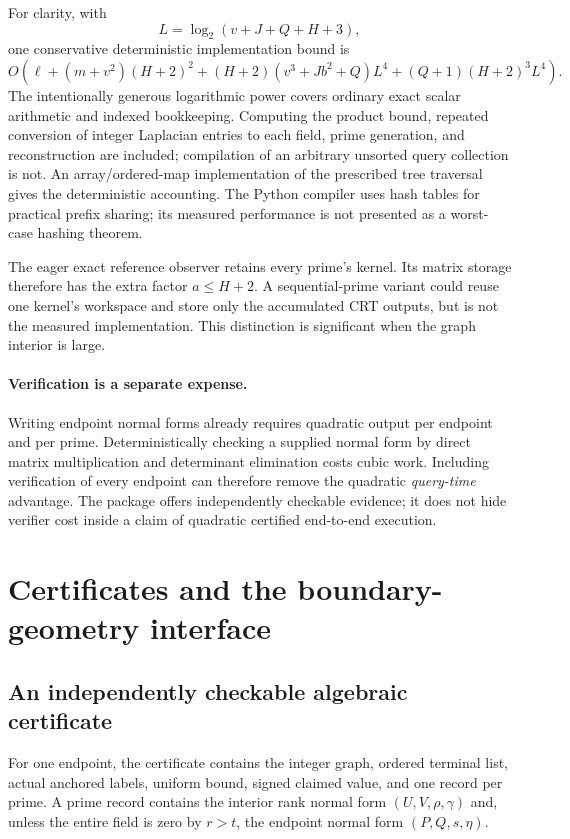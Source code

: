 \documentclass[11pt,letterpaper]{article}
\theoremstyle{definition}\newtheorem{definition}[theorem]{Definition}
\theoremstyle{remark}\newtheorem{remark}[theorem]{Remark}
\begin{document}
For clarity, with
\[
 L=\log_2(v+J+Q+H+3),
\]
one conservative deterministic implementation bound is
\begin{equation}
 O\!\left(\ell+(m+v^2)(H+2)^2
 +(H+2)(v^3+Jb^2+Q)L^4
 +(Q+1)(H+2)^3L^4\right).
 \label{eq:bitbound}
\end{equation}
The intentionally generous logarithmic power covers ordinary exact scalar arithmetic and indexed bookkeeping. Computing the product bound, repeated conversion of integer Laplacian entries to each field, prime generation, and reconstruction are included; compilation of an arbitrary unsorted query collection is not. An array/ordered-map implementation of the prescribed tree traversal gives the deterministic accounting. The Python compiler uses hash tables for practical prefix sharing; its measured performance is not presented as a worst-case hashing theorem.

The eager exact reference observer retains every prime's kernel. Its matrix storage therefore has the extra factor $a\leq H+2$. A sequential-prime variant could reuse one kernel's workspace and store only the accumulated CRT outputs, but is not the measured implementation. This distinction is significant when the graph interior is large.

\paragraph{Verification is a separate expense.}
Writing endpoint normal forms already requires quadratic output per endpoint and per prime. Deterministically checking a supplied normal form by direct matrix multiplication and determinant elimination costs cubic work. Including verification of every endpoint can therefore remove the quadratic \emph{query-time} advantage. The package offers independently checkable evidence; it does not hide verifier cost inside a claim of quadratic certified end-to-end execution.

\section{Certificates and the boundary-geometry interface}
\label{sec:cert}

\subsection{An independently checkable algebraic certificate}
For one endpoint, the certificate contains the integer graph, ordered terminal list, actual anchored labels, uniform bound, signed claimed value, and one record per prime. A prime record contains the interior rank normal form $(U,V,\rho,\gamma)$ and, unless the entire field is zero by $r>t$, the endpoint normal form $(P,Q,s,\eta)$.
\end{document}
